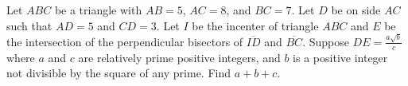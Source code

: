 Let $ABC$ be a triangle with $AB = 5$, $AC = 8$, and $BC = 7$. Let $D$ be on side $AC$ such that $AD = 5$ and $CD = 3$. Let $I$ be the incenter of triangle $ABC$ and $E$ be the intersection of the perpendicular bisectors of $\overline{ID}$ and $\overline{BC}$.  Suppose $DE = \frac{a\sqrt{b}}{c}$ where $a$ and $c$ are relatively prime positive integers, and $b$ is a positive integer not divisible by the square of any prime. Find $a+b+c$.
